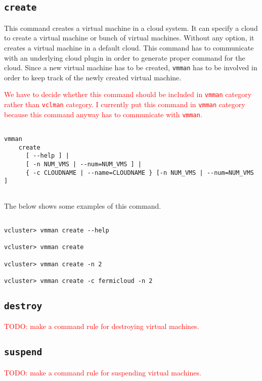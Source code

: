 \documentclass[11pt]{article}
\def \ttt{\texttt}
\def \vb{\verb}
\begin{document}
\subsection{\ttt{create}}

This command creates a virtual machine in a cloud system. It can specify a cloud to create a virtual machine or bunch of virtual machines. Without any option, it creates a virtual machine in a default cloud. This command has to communicate with an underlying cloud plugin in order to generate proper command for the cloud. Since a new virtual machine has to be created, \vb+vmman+ has to be involved in order to keep track of the newly created virtual machine.

\textcolor{red}{We have to decide whether this command should be included in \ttt{vmman} category rather than \ttt{vclman} category. I currently put this command in \ttt{vmman} category because this command anyway has to communicate with \ttt{vmman}.}

\begin{Verbatim}[fontfamily=courier, fontsize = \small, obeytabs
=true, tabsize=4, frame=lines]

vmman 
    create 
      [ --help ] |
      [ -n NUM_VMS | --num=NUM_VMS ] | 
      { -c CLOUDNAME | --name=CLOUDNAME } [-n NUM_VMS | --num=NUM_VMS ]  
      
\end{Verbatim}

The below shows some examples of this command.

\begin{Verbatim}[fontfamily=courier, fontsize = \small, obeytabs
=true, tabsize=4, frame=lines]

vcluster> vmman create --help

vcluster> vmman create  

vcluster> vmman create -n 2

vcluster> vmman create -c fermicloud -n 2

\end{Verbatim}



\subsection{\ttt{destroy}}
\textcolor{red}{TODO: make a command rule for destroying virtual machines.}



\subsection{\ttt{suspend}}
\textcolor{red}{TODO: make a command rule for suspending virtual machines.}
\end{document}
